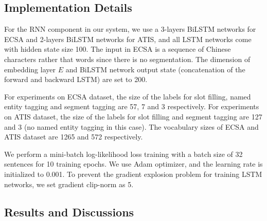 \subsection{Implementation Details}
\label{sec:implementation}
For the RNN component in our system,
we use a 3-layers BiLSTM networks for ECSA and 2-layers BiLSTM networks for ATIS,
and all LSTM networks come with hidden state size 100.
The input in ECSA is a sequence of Chinese characters rather that words 
since there is no segmentation.
The dimension of embedding layer $E$ 
and BiLSTM network output state (concatenation of the forward and backward LSTM) are set to 200.

For experiments on ECSA dataset, the size of the labels for slot filling,
named entity tagging and segment tagging are 57, 7 and 3 respectively.
For experiments on ATIS dataset, the size of the labels for slot filling and 
segment tagging are 127 and 3 (no named entity tagging in this case).
The vocabulary sizes of ECSA and ATIS dataset are 1265 and 572 respectively.

We perform a mini-batch log-likelihood loss training with a batch size of 
32 sentences for 10 training epochs.
We use Adam optimizer, and the learning rate is initialized to 0.001.
To prevent the gradient explosion problem for training LSTM networks,
we set gradient clip-norm as 5.

\subsection{Results and Discussions}
\label{sec:eval}

